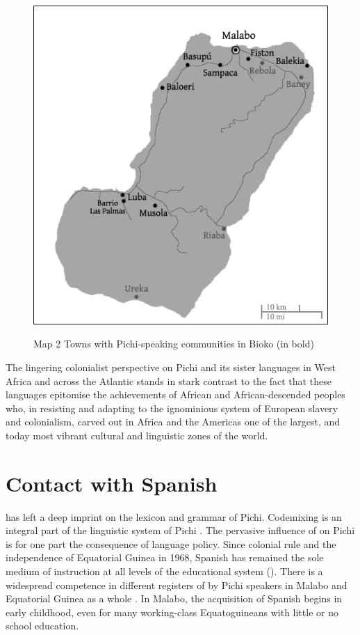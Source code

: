 \begin{figure}
	\caption{Map 2 Towns with Pichi-speaking communities in Bioko (in bold)}
	\includegraphics[width=.5\textwidth]{figures/yakpomod-img2.png}
	\label{map:1:1.2}
\end{figure}

The lingering colonialist perspective on Pichi and its sister languages in West Africa and across the Atlantic stands in stark contrast to the fact that these languages epitomise the achievements of African and African-descended peoples who, in resisting and adapting to the ignominious system of European slavery and colonialism, carved out in Africa and the Americas one of the largest, and today most vibrant cultural and linguistic zones of the world.

\section{Contact with Spanish}\label{sec:1.2}

 has left a deep imprint on the lexicon and grammar of Pichi. Codemixing is an integral part of the linguistic system of Pichi \citep{Yakpo2009complexity,Yakpo2018}. The pervasive influence of  on Pichi is for one part the consequence of language policy. Since colonial rule and the independence of Equatorial Guinea in 1968, Spanish has remained the sole medium of instruction at all levels of the educational system (\citealt[35–36]{Lipski1992}). There is a widespread competence in different registers of  by Pichi speakers in Malabo and Equatorial Guinea as a whole \citep{Lipski1985,García2016}. In Malabo, the acquisition of Spanish begins in early childhood, even for many working-class Equatoguineans with little or no school education. 

